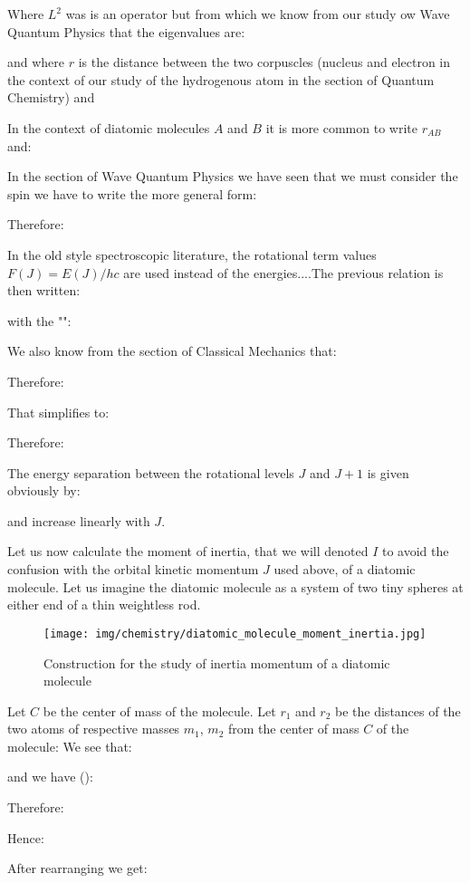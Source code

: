 	Where $L^2$ was is an operator but from which we know from our study ow Wave Quantum Physics that the eigenvalues are:
	
	and where $r$ is the distance between the two corpuscles (nucleus and electron in the context of our study of the hydrogenous atom in the section of Quantum Chemistry) and
	
	In the context of diatomic molecules $A$ and $B$ it is more common to write $r_{AB}$ and:
	

	In the section of Wave Quantum Physics we have seen that we must consider the spin we have to write the more general form:
	
	Therefore:
	
	In the old style spectroscopic literature, the rotational term values $F(J) = E(J)/hc$ are used instead of the energies....The previous relation is then written:
	
	with the "":
	
	
	We also know from the section of Classical Mechanics that:
	
	Therefore:
	
	That simplifies to:
	
	Therefore:
	
	
	The energy separation between the rotational levels $J$ and $J+1$ is given obviously by:
	
	and increase linearly with $J$.
	
	Let us now calculate the moment of inertia, that we will denoted $I$ to avoid the confusion with the orbital kinetic momentum $J$ used above, of a diatomic molecule. Let us imagine the diatomic molecule as a system of two tiny spheres at either end of a thin weightless rod.
	\begin{figure}[H]
		\centering
		\texttt{[image: img/chemistry/diatomic\_molecule\_moment\_inertia.jpg]}	
		\caption{Construction for the study of inertia momentum of a diatomic molecule}
	\end{figure}
	Let $C$ be the center of mass of the molecule. Let $r_1$ and $r_2$ be the distances of the two atoms of respective masses $m_1$, $m_2$ from the center of mass $C$ of the molecule:
	We see that:
	
	and we have ():
	
	Therefore:
	
	Hence:
	
	After rearranging we get:
	
